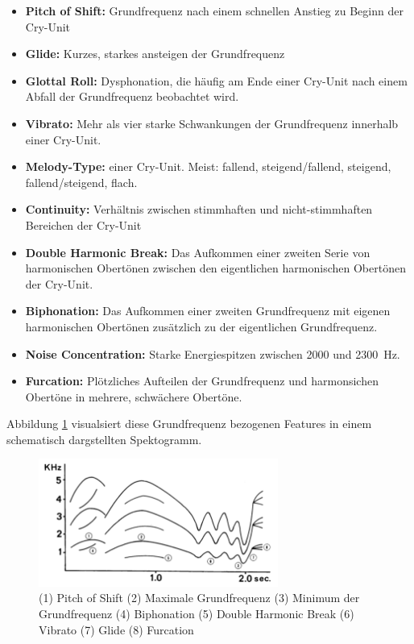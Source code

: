 \begin{itemize}
\item \textbf{Pitch of Shift:} Grundfrequenz nach einem schnellen Anstieg zu Beginn der Cry-Unit
\item \textbf{Glide:} Kurzes, starkes ansteigen der Grundfrequenz
\item  \textbf{Glottal Roll:} Dysphonation, die häufig am Ende einer Cry-Unit nach einem Abfall der Grundfrequenz beobachtet wird.
\item  \textbf{Vibrato:} Mehr als vier starke Schwankungen der Grundfrequenz innerhalb einer Cry-Unit.
\item  \textbf{Melody-Type:} einer Cry-Unit. Meist: fallend, steigend/fallend, steigend, fallend/steigend, flach. 
\item  \textbf{Continuity:} Verhältnis zwischen stimmhaften und nicht-stimmhaften Bereichen der Cry-Unit
\item  \textbf{Double Harmonic Break:} Das Aufkommen einer zweiten Serie von harmonischen Obertönen zwischen den eigentlichen harmonischen Obertönen der Cry-Unit.
\item  \textbf{Biphonation:} Das Aufkommen einer zweiten Grundfrequenz mit eigenen harmonischen Obertönen zusätzlich zu der eigentlichen Grundfrequenz.
\item  \textbf{Noise Concentration:} Starke Energiespitzen zwischen 2000 und \SI{2300}{\hertz}.
\item  \textbf{Furcation:} Plötzliches Aufteilen der Grundfrequenz und harmonsichen Obertöne in mehrere, schwächere Obertöne.
\end{itemize}

Abbildung \ref{img:cryMelodies} visualsiert diese Grundfrequenz bezogenen Features in einem schematisch dargstellten Spektogramm.

\begin{figure}
	\centering
	\includegraphics[width=0.7\textwidth]{bilder/melodyTypes.png}
	\caption{(1) Pitch of Shift (2) Maximale Grundfrequenz (3) Minimum der Grundfrequenz (4) Biphonation (5) Double Harmonic Break (6) Vibrato (7) Glide (8) Furcation \cite[S. 142]{signal}}
	\label{img:cryMelodies}
\end{figure}

